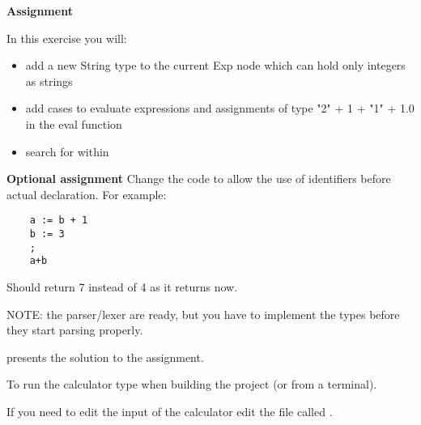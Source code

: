 {\bf Assignment}

In this exercise you will:
\begin{itemize}
\item add a new String type to the current Exp node which can hold only integers as strings
\item add cases to evaluate expressions and assignments of type "2" + 1 + "1" + 1.0 in the eval function
\item search for  within 
\end{itemize}

{\bf Optional assignment}
Change the code to allow the use of identifiers before actual declaration.
For example:
\begin{verbatim}
	a := b + 1
	b := 3
	;
	a+b
\end{verbatim}
Should return 7 instead of 4 as it returns now.

NOTE: the parser/lexer are ready, but you have to implement the types
before they start parsing  properly.

 presents the solution to the assignment.

To run the calculator type  when building the project (or  from a terminal).

If you need to edit the input of the calculator edit the file called .
